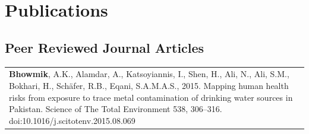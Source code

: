 \section{Publications}

\label{Publications}

\subsection{Peer Reviewed Journal Articles}

\label{Peer Reviewed Journal Articles}

\begin{table}[hp!]

\label{Table CV5}

\begin{tabular}{>{\raggedright\arraybackslash}p{14.0cm}}

\textbf{Bhowmik}, A.K., Alamdar, A., Katsoyiannis, I., Shen, H., Ali, N., Ali, S.M., Bokhari, H., Schäfer, R.B., Eqani, S.A.M.A.S., 2015. Mapping human health risks from exposure to trace metal contamination of drinking water sources in Pakistan. Science of The Total Environment 538, 306–316. doi:10.1016/j.scitotenv.2015.08.069\\

\end{tabular}

\end{table}

\newpage

